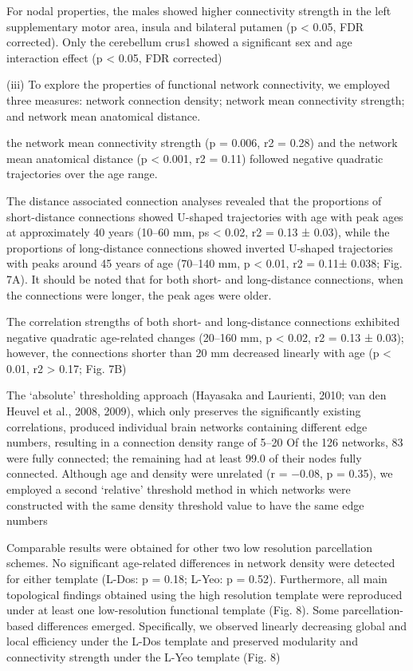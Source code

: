 For nodal properties, the
males showed higher connectivity strength in the left
supplementary motor area, insula and bilateral putamen 
(p < 0.05, FDR corrected). Only the cerebellum crus1
showed a significant sex and age interaction effect (p < 0.05,
FDR corrected)


(iii) To explore the properties of functional network
connectivity, we employed three measures: network connection density; 
network mean connectivity strength; and network mean anatomical distance.

the network mean connectivity strength
(p = 0.006, r2 = 0.28) and the network mean anatomical
distance (p < 0.001, r2 = 0.11) followed negative quadratic
trajectories over the age range.

The distance associated connection analyses revealed that the proportions 
of short-distance connections showed U-shaped
trajectories with age with peak ages at approximately 40
years (10–60 mm, ps < 0.02, r2 = 0.13 ± 0.03), while the proportions 
of long-distance connections showed inverted
U-shaped trajectories with peaks around 45 years of age
(70–140 mm, p < 0.01, r2 = 0.11± 0.038; Fig. 7A). It should
be noted that for both short- and long-distance connections, when the 
connections were longer, the peak
ages were older.

The correlation strengths of both short- and long-distance connections 
exhibited negative quadratic age-related changes
(20–160 mm, p < 0.02, r2 = 0.13 ± 0.03); however, the connections shorter 
than 20 mm decreased linearly with age
(p < 0.01, r2 > 0.17; Fig. 7B)

The ‘absolute’ thresholding approach (Hayasaka and
Laurienti, 2010; van den Heuvel et al., 2008, 2009),
which only preserves the significantly existing correlations, 
produced individual brain networks containing
different edge numbers, resulting in a connection density
range of 5–20%
Of the 126 networks, 83 were fully connected; 
the remaining had at least 99.0%
of their nodes
fully connected. Although age and density were unrelated
(r = −0.08, p = 0.35), we employed a second ‘relative’ 
threshold method in which networks were constructed with
the same density threshold value to have the same edge
numbers

Comparable results were obtained for other two low resolution parcellation 
schemes. No significant age-related
differences in network density were detected for either
template (L-Dos: p = 0.18; L-Yeo: p = 0.52). Furthermore,
all main topological findings obtained using the high
resolution template were reproduced under at least
one low-resolution functional template (Fig. 8). Some
parcellation-based differences emerged. Specifically, we
observed linearly decreasing global and local efficiency
under the L-Dos template and preserved modularity and
connectivity strength under the L-Yeo template (Fig. 8)



